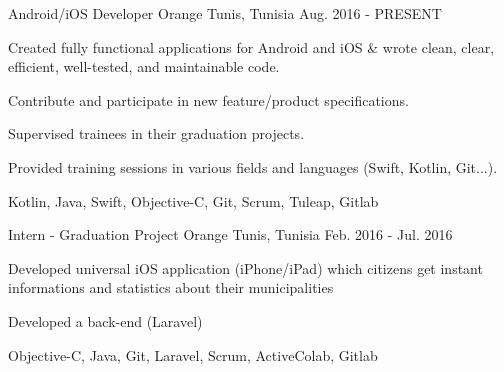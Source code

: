 

\begin{cventries}

  \cventrydetailed
    {Android/iOS Developer} %
    {Orange} %
    {Tunis, Tunisia} %
    {Aug. 2016 - PRESENT} %
    {
      \begin{cvitems} %
        \item {Created fully functional applications for Android and iOS \& wrote clean, clear, efficient, well-tested, and maintainable code.}
        \item {Contribute and participate in new feature/product specifications.}
        \item {Supervised trainees in their graduation projects.}
        \item {Provided training sessions in various fields and languages (Swift, Kotlin, Git...).}
      \end{cvitems}
    }
    {Kotlin, Java, Swift, Objective-C, Git, Scrum, Tuleap, Gitlab} %
    
  \cventrydetailed
    {Intern - Graduation Project} %
    {Orange} %
    {Tunis, Tunisia} %
    {Feb. 2016 - Jul. 2016} %
    {
      \begin{cvitems} %
        \item {Developed universal iOS application (iPhone/iPad) which citizens get instant informations and statistics about their municipalities}
        \item {Developed a back-end (Laravel)}
      \end{cvitems}
    }
    {Objective-C, Java, Git, Laravel, Scrum, ActiveColab, Gitlab} %


\end{cventries}
